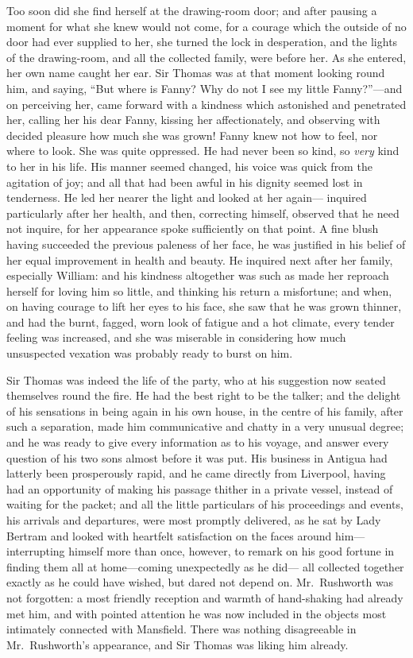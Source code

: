 \documentclass{article}
\begin{document}
Too soon did she find herself at the drawing-room door;
and after pausing a moment for what she knew would not come,
for a courage which the outside of no door had ever supplied
to her, she turned the lock in desperation, and the lights
of the drawing-room, and all the collected family,
were before her.  As she entered, her own name caught
her ear.  Sir Thomas was at that moment looking round him,
and saying, ``But where is Fanny?  Why do not I see
my little Fanny?''---and on perceiving her, came forward
with a kindness which astonished and penetrated her,
calling her his dear Fanny, kissing her affectionately,
and observing with decided pleasure how much she was grown!
Fanny knew not how to feel, nor where to look.  She was
quite oppressed.  He had never been so kind, so \emph{very}
kind to her in his life.  His manner seemed changed,
his voice was quick from the agitation of joy; and all that
had been awful in his dignity seemed lost in tenderness.
He led her nearer the light and looked at her again---%
inquired particularly after her health, and then,
correcting himself, observed that he need not inquire,
for her appearance spoke sufficiently on that point.  A fine
blush having succeeded the previous paleness of her face,
he was justified in his belief of her equal improvement
in health and beauty.  He inquired next after her family,
especially William:  and his kindness altogether was such
as made her reproach herself for loving him so little,
and thinking his return a misfortune; and when, on having
courage to lift her eyes to his face, she saw that he
was grown thinner, and had the burnt, fagged, worn look
of fatigue and a hot climate, every tender feeling
was increased, and she was miserable in considering
how much unsuspected vexation was probably ready to burst
on him.

Sir Thomas was indeed the life of the party, who at
his suggestion now seated themselves round the fire.
He had the best right to be the talker; and the delight
of his sensations in being again in his own house,
in the centre of his family, after such a separation,
made him communicative and chatty in a very unusual degree;
and he was ready to give every information as to his voyage,
and answer every question of his two sons almost before
it was put.  His business in Antigua had latterly been
prosperously rapid, and he came directly from Liverpool,
having had an opportunity of making his passage thither
in a private vessel, instead of waiting for the packet;
and all the little particulars of his proceedings and events,
his arrivals and departures, were most promptly delivered,
as he sat by Lady Bertram and looked with heartfelt
satisfaction on the faces around him---interrupting himself
more than once, however, to remark on his good fortune
in finding them all at home---coming unexpectedly as he did---%
all collected together exactly as he could have wished,
but dared not depend on.  Mr.\ Rushworth was not forgotten:
a most friendly reception and warmth of hand-shaking
had already met him, and with pointed attention he was
now included in the objects most intimately connected
with Mansfield.  There was nothing disagreeable in
Mr.\ Rushworth's appearance, and Sir Thomas was liking
him already.
\end{document}
